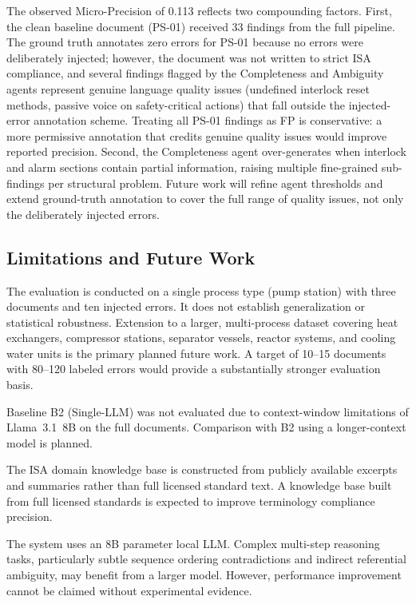 \documentclass[journal]{IEEEtran}
\begin{document}
The observed Micro-Precision of 0.113 reflects two compounding factors. First,
the clean baseline document (PS-01) received 33 findings from the full pipeline.
The ground truth annotates zero errors for PS-01 because no errors were
deliberately injected; however, the document was not written to strict ISA
compliance, and several findings flagged by the Completeness and Ambiguity
agents represent genuine language quality issues (undefined interlock reset
methods, passive voice on safety-critical actions) that fall outside the
injected-error annotation scheme. Treating all PS-01 findings as FP is
conservative: a more permissive annotation that credits genuine quality issues
would improve reported precision. Second, the Completeness agent over-generates
when interlock and alarm sections contain partial information, raising multiple
fine-grained sub-findings per structural problem. Future work will refine agent
thresholds and extend ground-truth annotation to cover the full range of quality
issues, not only the deliberately injected errors.

\subsection{Limitations and Future Work}

The evaluation is conducted on a single process type (pump station) with three
documents and ten injected errors. It does not establish generalization or
statistical robustness. Extension to a larger, multi-process dataset covering
heat exchangers, compressor stations, separator vessels, reactor systems, and
cooling water units is the primary planned future work. A target of 10--15
documents with 80--120 labeled errors would provide a substantially stronger
evaluation basis.

Baseline B2 (Single-LLM) was not evaluated due to context-window limitations
of Llama~3.1~8B on the full documents. Comparison with B2 using a longer-context
model is planned.

The ISA domain knowledge base is constructed from publicly available excerpts
and summaries rather than full licensed standard text. A knowledge base built
from full licensed standards is expected to improve terminology compliance
precision.

The system uses an 8B parameter local LLM. Complex multi-step reasoning tasks,
particularly subtle sequence ordering contradictions and indirect referential
ambiguity, may benefit from a larger model. However, performance improvement
cannot be claimed without experimental evidence.
\end{document}
